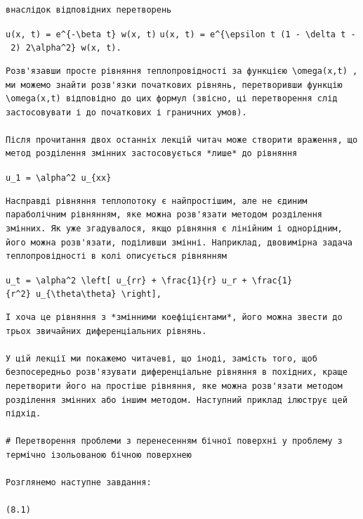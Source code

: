 \documentclass[
  ukrainian,
]{article}
\begin{document}
\begin{verbatim}
внаслідок відповідних перетворень
\end{verbatim}

\texttt{u(x,\ t)\ =\ e\^{}\{-\textbackslash{}beta\ t\}\ w(x,\ t)}
\texttt{u(x,\ t)\ =\ e\^{}\{\textbackslash{}epsilon\ t\ (1\ -\ \textbackslash{}delta\ t\ -\ 2)\ 2\textbackslash{}alpha\^{}2\}\ w(x,\ t).}

\begin{verbatim}
Розв'язавши просте рівняння теплопровідності за функцією \omega(x,t) , ми можемо знайти розв'язки початкових рівнянь, перетворивши функцію \omega(x,t) відповідно до цих формул (звісно, ці перетворення слід застосовувати і до початкових і граничних умов).

Після прочитання двох останніх лекцій читач може створити враження, що метод розділення змінних застосовується *лише* до рівняння
\end{verbatim}

\texttt{u\_1\ =\ \textbackslash{}alpha\^{}2\ u\_\{xx\}}

\begin{verbatim}
Насправді рівняння теплопотоку є найпростішим, але не єдиним параболічним рівнянням, яке можна розв'язати методом розділення змінних. Як уже згадувалося, якщо рівняння є лінійним і однорідним, його можна розв'язати, поділивши змінні. Наприклад, двовимірна задача теплопровідності в колі описується рівнянням
\end{verbatim}

\texttt{u\_t\ =\ \textbackslash{}alpha\^{}2\ \textbackslash{}left{[}\ u\_\{rr\}\ +\ \textbackslash{}frac\{1\}\{r\}\ u\_r\ +\ \textbackslash{}frac\{1\}\{r\^{}2\}\ u\_\{\textbackslash{}theta\textbackslash{}theta\}\ \textbackslash{}right{]},}

\begin{verbatim}
І хоча це рівняння з *змінними коефіцієнтами*, його можна звести до трьох звичайних диференціальних рівнянь.

У цій лекції ми покажемо читачеві, що іноді, замість того, щоб безпосередньо розв'язувати диференціальне рівняння в похідних, краще перетворити його на простіше рівняння, яке можна розв'язати методом розділення змінних або іншим методом. Наступний приклад ілюструє цей підхід.

# Перетворення проблеми з перенесенням бічної поверхні у проблему з термічно ізольованою бічною поверхнею

Розглянемо наступне завдання:

(8.1)
\end{verbatim}
\end{document}
